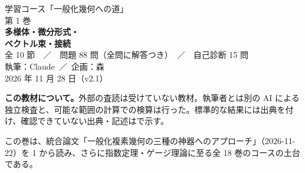 \begin{titlepage}
\thispagestyle{empty}
\centering
\vspace*{18mm}
{\large\sffamily 学習コース「一般化幾何への道」}\\[6mm]
{\Large\sffamily 第 1 巻}\\[8mm]
{\Huge\sffamily\bfseries 多様体・微分形式・\\[3mm]ベクトル束・接続}\\[16mm]
{\large 全 10 節　／　問題 88 問（全問に解答つき）　／　自己診断 15 問}\\[24mm]
{\large 執筆：Claude\ ／\ 企画：森}\\[4mm]
{\large 2026 年 11 月 28 日（v2.1）}\\[24mm]
\begin{tcolorbox}[colback=gray!6!white,colframe=gray!60!black,boxrule=0.5pt,width=0.86\textwidth,left=6pt,right=6pt,top=4pt,bottom=4pt,halign=flush left]
\small\textbf{この教材について。}外部の査読は受けていない教材。執筆者とは別の AI による独立検査と、可能な範囲の計算での検算は行った。標準的な結果には出典を付け、確認できていない出典・記述は\tQ で示す。
\end{tcolorbox}
\vfill
{\small この巻は、統合論文「一般化複素幾何の三種の神器へのアプローチ」（2026-11-22）を 1 から読み、さらに指数定理・ゲージ理論に至る全 18 巻のコースの土台である。}
\end{titlepage}

